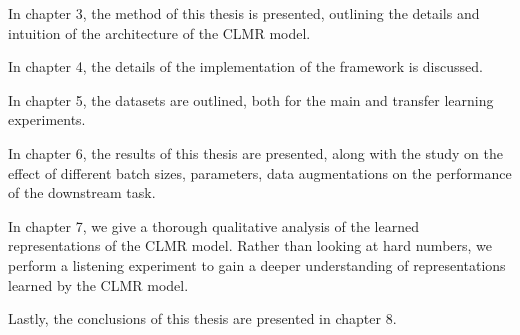 In chapter 3, the method of this thesis is presented, outlining the details and intuition of the architecture of the CLMR model.

In chapter 4, the details of the implementation of the framework is discussed.

In chapter 5, the datasets are outlined, both for the main and transfer learning experiments.

In chapter 6, the results of this thesis are presented, along with the study on the effect of different batch sizes, parameters, data augmentations on the performance of the downstream task.

In chapter 7, we give a thorough qualitative analysis of the learned representations of the CLMR model. Rather than looking at hard numbers, we perform a listening experiment to gain a deeper understanding of representations learned by the CLMR model.

Lastly, the conclusions of this thesis are presented in chapter 8.

